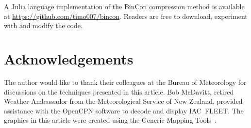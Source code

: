 \documentclass[12pt,a4paper]{article}
\begin{document}
A Julia language implementation of the BinCon compression method is available
at \url{https://github.com/timo007/bincon}. Readers are free to download,
experiment with and modify the code.

\section*{Acknowledgements}
\label{sec:acknowledgements}

The author would like to thank their colleagues at the Bureau of Meteorology
for discussions on the techniques presented in this article. Bob McDavitt,
retired Weather Ambassador from the Meteorological Service of New Zealand,
provided assistance with the OpenCPN software to decode and display IAC~FLEET.
The graphics in this article were created using the Generic Mapping
Tools~\citep{wessel_etal2019}.
\end{document}
